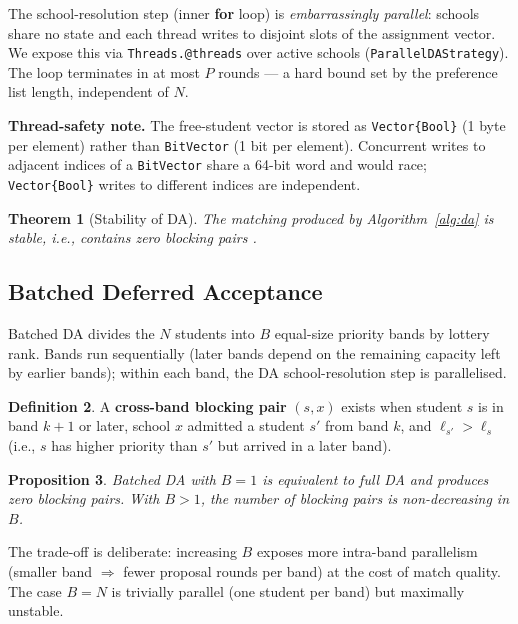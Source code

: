 \documentclass{article}
\theoremstyle{plain}
\newtheorem{theorem}{Theorem}[section]
\newtheorem{proposition}[theorem]{Proposition}
\theoremstyle{definition}
\newtheorem{definition}[theorem]{Definition}
\theoremstyle{remark}
\begin{document}
The school-resolution step (inner \textbf{for} loop) is
\emph{embarrassingly parallel}: schools share no state and each thread
writes to disjoint slots of the assignment vector. We expose this via
\texttt{Threads.@threads} over active schools (\texttt{ParallelDAStrategy}).
The loop terminates in at most $P$ rounds --- a hard bound set by the
preference list length, independent of $N$.

\textbf{Thread-safety note.} The free-student vector is stored as
\texttt{Vector\{Bool\}} (1 byte per element) rather than \texttt{BitVector}
(1 bit per element). Concurrent writes to adjacent indices of a
\texttt{BitVector} share a 64-bit word and would race; \texttt{Vector\{Bool\}}
writes to different indices are independent.

\begin{theorem}[Stability of DA]
The matching produced by Algorithm~\ref{alg:da} is stable, i.e., contains
zero blocking pairs \cite{gale1962college}.
\end{theorem}

\subsection{Batched Deferred Acceptance}

Batched DA divides the $N$ students into $B$ equal-size priority bands by
lottery rank. Bands run sequentially (later bands depend on the remaining
capacity left by earlier bands); within each band, the DA school-resolution
step is parallelised.

\begin{definition}
A \textbf{cross-band blocking pair} $(s, x)$ exists when student $s$ is in
band $k+1$ or later, school $x$ admitted a student $s'$ from band $k$, and
$\ell_{s'} > \ell_s$ (i.e., $s$ has higher priority than $s'$ but arrived in
a later band).
\end{definition}

\begin{proposition}
Batched DA with $B = 1$ is equivalent to full DA and produces zero blocking
pairs. With $B > 1$, the number of blocking pairs is non-decreasing in $B$.
\end{proposition}

The trade-off is deliberate: increasing $B$ exposes more intra-band
parallelism (smaller band $\Rightarrow$ fewer proposal rounds per band) at
the cost of match quality. The case $B = N$ is trivially parallel (one
student per band) but maximally unstable.
\end{document}
